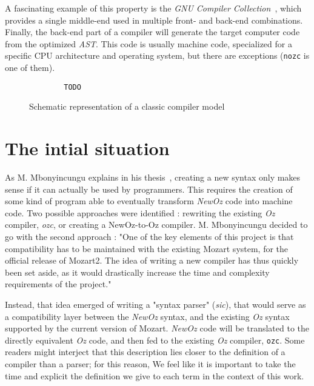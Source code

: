 A fascinating example of this property is the \textit{GNU Compiler Collection}~\cite{gcc}, which provides a single middle-end used in multiple front- and back-end combinations.\newline
Finally, the back-end part of a compiler will generate the target computer code from the optimized \textit{AST}.
This code is usually machine code, specialized for a specific CPU architecture and operating system, but there are exceptions (\texttt{nozc} is one of them).
\begin{figure}
    \begin{lstlisting}
        TODO
    \end{lstlisting}
    \caption{Schematic representation of a classic compiler model}
\end{figure}

\section{The intial situation}\label{sec:ch3-Parser}
As M. Mbonyincungu explains in his thesis~\cite{jpthesis}, creating a new syntax only makes sense if it can actually be used by programmers.
This requires the creation of some kind of program able to eventually transform \textit{NewOz} code into machine code.
Two possible approaches were identified : rewriting the existing \textit{Oz} compiler, \textit{ozc}, or creating a NewOz-to-Oz compiler.
M. Mbonyincungu decided to go with the second approach :
"One of the key elements of this project is that compatibility has to be maintained with the existing Mozart system, for the official release of Mozart2.
The idea of writing a new compiler has thus quickly been set aside, as it would drastically increase the time and complexity requirements of the project."~\cite{jpthesis}

Instead, that idea emerged of writing a "syntax parser" (\textit{sic}), that would serve as a compatibility layer between the \textit{NewOz} syntax, and the existing \textit{Oz} syntax supported by the current version of Mozart.
\textit{NewOz} code will be translated to the directly equivalent \textit{Oz} code, and then fed to the existing \textit{Oz} compiler, \texttt{ozc}.
Some readers might interject that this description lies closer to the definition of a compiler than a parser;
for this reason, We feel like it is important to take the time and explicit the definition we give to each term in the context of this work.\newline

